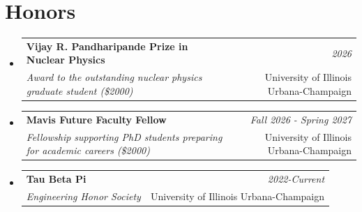 \documentclass[a4paper,11pt]{article}
\makeatletter
\newcommand{\resumeItem}[2]{
  \item{
    \textbf{#1}{\hspace{0.5mm}#2 \vspace{-0.5mm}}
  }
}
\newcommand{\resumeSubheading}[4]{
\vspace{0.5mm}\item
    \begin{tabular*}{0.98\textwidth}[t]{l@{\extracolsep{\fill}}r}
        \textbf{#1} & \textit{\footnotesize{#4}} \\
        \textit{\footnotesize{#3}} &  \footnotesize{#2}\\
    \end{tabular*}
    \vspace{-2.4mm}
}
\newcommand{\resumeSubItem}[2]{\resumeItem{#1}{#2}\vspace{-4pt}}
\newcommand{\resumeSubHeadingListStart}{\begin{itemize}[leftmargin=*,labelsep=1mm]}
\newcommand{\resumeHeadingSkillStart}{\begin{itemize}[leftmargin=*,itemsep=1.7mm, rightmargin=2ex]}
\newcommand{\resumeSubHeadingListEnd}{\end{itemize}\vspace{2mm}}
\newcommand{\resumeHeadingSkillEnd}{\end{itemize}\vspace{-2mm}}
\makeatother
\begin{document}









\section{\textbf{Honors}}
\vspace{-0.4mm}
  \resumeSubHeadingListStart
  \resumeSubheading
    {Vijay R. Pandharipande Prize in Nuclear Physics}{University of Illinois Urbana-Champaign}{Award to the outstanding nuclear physics graduate student (\$2000)}{2026}
  \resumeSubheading
    {Mavis Future Faculty Fellow}{University of Illinois Urbana-Champaign}{Fellowship supporting PhD students preparing for academic careers (\$2000)}{Fall 2026 - Spring 2027}
  \resumeSubheading
    {Tau Beta Pi}{University of Illinois Urbana-Champaign}{Engineering Honor Society}{2022-Current}
  \resumeSubHeadingListEnd
\vspace{-6mm}








 
\end{document}
